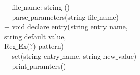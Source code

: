 {
+ file$\_$name: string
}
{
\dunder()\\
+ parse$\_$parameters(string file$\_$name) \\
+ void declare$\_$entry(string entry$\_$name, \\ string default$\_$value, \\ Reg$\_$Ex(?) pattern)\\
+ set(string entry$\_$name, string new$\_$value)\\
+ print$\_$paramters()
}
